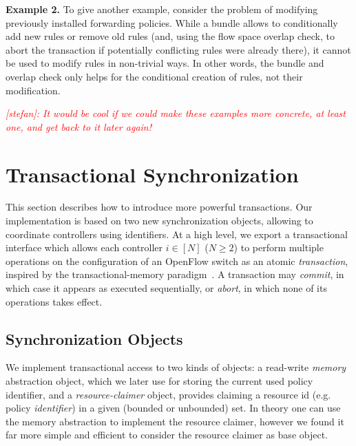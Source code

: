 \documentclass[conference]{sigcomm-alternate}
\newcommand{\stefan}[1]{\textit{\textcolor{red}{[stefan]: #1}}} %
\begin{document}
\textbf{Example 2.} To give another example,
consider the problem of modifying previously
installed forwarding policies.
While a bundle allows to conditionally add new rules or remove
old rules (and, using the flow space overlap
check, to abort the transaction if potentially conflicting
rules were already there), it cannot be used
to modify rules in non-trivial ways.
In other words, the bundle and overlap check only helps
for the conditional creation of rules, not their modification.

\stefan{It would be cool if we could make these examples more concrete,
at least one, and get back to it later again!}

\section{Transactional Synchronization}\label{sec:main}

This section describes how to introduce more powerful transactions.
Our implementation is based on two new synchronization objects,
allowing to coordinate controllers using identifiers.
At a high level, we export a
transactional interface which allows each controller $i\in[N]$ ($N\geq
2$) to perform multiple
operations on the configuration of an OpenFlow switch as an atomic
\emph{transaction}, inspired by the transactional-memory paradigm~\cite{stm-st95,tm-book}. A transaction may \emph{commit}, in
which case it appears as executed sequentially, or \emph{abort}, in
which none of its operations takes effect.

\subsection{Synchronization Objects}\label{sec:t-if}

We implement transactional access to  two kinds of objects: a read-write \emph{memory} abstraction
object, which we later use for storing the current used policy identifier, and a
\emph{resource-claimer} object, provides claiming a resource id (e.g. policy \emph{identifier}) in a
given (bounded or unbounded) set.
In theory one can use the memory abstraction to implement the resource claimer, 
however we found it far more simple and efficient to consider the resource claimer as base object.
%
\end{document}
